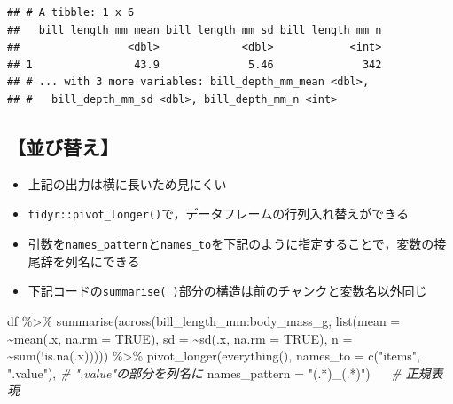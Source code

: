 \documentclass[
  xelatex,ja=standard, b5paper]{bxjsbook}
\newenvironment{Shaded}{\begin{snugshade}}{\end{snugshade}}
\newcommand{\AttributeTok}[1]{\textcolor[rgb]{0.77,0.63,0.00}{#1}}
\newcommand{\CommentTok}[1]{\textcolor[rgb]{0.56,0.35,0.01}{\textit{#1}}}
\newcommand{\ConstantTok}[1]{\textcolor[rgb]{0.00,0.00,0.00}{#1}}
\newcommand{\FunctionTok}[1]{\textcolor[rgb]{0.00,0.00,0.00}{#1}}
\newcommand{\NormalTok}[1]{#1}
\newcommand{\SpecialCharTok}[1]{\textcolor[rgb]{0.00,0.00,0.00}{#1}}
\newcommand{\StringTok}[1]{\textcolor[rgb]{0.31,0.60,0.02}{#1}}
\providecommand{\tightlist}{%
  \setlength{\itemsep}{0pt}\setlength{\parskip}{0pt}}
\begin{document}
\begin{verbatim}
## # A tibble: 1 x 6
##   bill_length_mm_mean bill_length_mm_sd bill_length_mm_n
##                 <dbl>             <dbl>            <int>
## 1                43.9              5.46              342
## # ... with 3 more variables: bill_depth_mm_mean <dbl>,
## #   bill_depth_mm_sd <dbl>, bill_depth_mm_n <int>
\end{verbatim}

\hypertarget{su-st-reorder}{%
\subsection{【並び替え】}\label{su-st-reorder}}

\begin{itemize}
\tightlist
\item
  上記の出力は横に長いため見にくい
\item
  \texttt{tidyr::pivot\_longer()}で，データフレームの行列入れ替えができる
\item
  引数を\texttt{names\_pattern}と\texttt{names\_to}を下記のように指定することで，変数の接尾辞を列名にできる
\item
  下記コードの\texttt{summarise(\ )}部分の構造は前のチャンクと変数名以外同じ
\end{itemize}

\begin{Shaded}
\begin{Highlighting}[]
\NormalTok{df }\SpecialCharTok{\%\textgreater{}\%} 
  \FunctionTok{summarise}\NormalTok{(}\FunctionTok{across}\NormalTok{(bill\_length\_mm}\SpecialCharTok{:}\NormalTok{body\_mass\_g,}
                   \FunctionTok{list}\NormalTok{(}\AttributeTok{mean =} \SpecialCharTok{\textasciitilde{}}\FunctionTok{mean}\NormalTok{(.x, }\AttributeTok{na.rm =} \ConstantTok{TRUE}\NormalTok{),}
                        \AttributeTok{sd =} \SpecialCharTok{\textasciitilde{}}\FunctionTok{sd}\NormalTok{(.x, }\AttributeTok{na.rm =} \ConstantTok{TRUE}\NormalTok{),}
                        \AttributeTok{n =} \SpecialCharTok{\textasciitilde{}}\FunctionTok{sum}\NormalTok{(}\SpecialCharTok{!}\FunctionTok{is.na}\NormalTok{(.x))))) }\SpecialCharTok{\%\textgreater{}\%} 
  \FunctionTok{pivot\_longer}\NormalTok{(}\FunctionTok{everything}\NormalTok{(),}
               \AttributeTok{names\_to =} \FunctionTok{c}\NormalTok{(}\StringTok{"items"}\NormalTok{, }\StringTok{".value"}\NormalTok{), }\CommentTok{\# ".value"の部分を列名に}
               \AttributeTok{names\_pattern =} \StringTok{"(.*)\_(.*)"}\NormalTok{) 　  }\CommentTok{\# 正規表現}
\end{Highlighting}
\end{Shaded}
\end{document}
